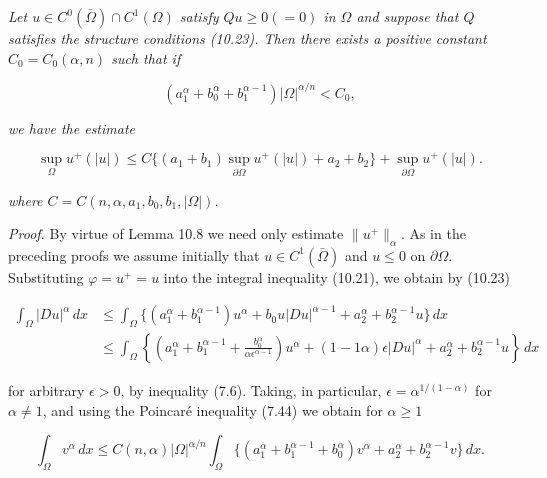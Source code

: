 \begin{theorem}\label{gilbarg-trudinger.thm.10.10.small-data-divergence-form-bound}
\textit{Let $u \in C^0(\bar{\Omega}) \cap C^1(\Omega)$ satisfy $Qu \geq 0 (=0)$ in $\Omega$ and suppose
that $Q$ satisfies the structure conditions (10.23). Then there exists a positive constant
$C_0 = C_0(\alpha,n)$ such that if}

\begin{equation}
(a_1^{\alpha} + b_0^{\alpha} + b_1^{\alpha-1})|\Omega|^{\alpha/n} < C_0,
\tag{10.28}
\end{equation}

\textit{we have the estimate}

\begin{equation}
\sup_{\Omega} u^+(|u|) \leq C\{(a_1+b_1)\sup_{\partial\Omega} u^+(|u|) + a_2 + b_2\} + \sup_{\partial\Omega} u^+(|u|).
\tag{10.29}
\end{equation}

\textit{where $C = C(n,\alpha,a_1,b_0,b_1,|\Omega|)$.}
\end{theorem}

\medskip

\noindent\textit{Proof.} By virtue of Lemma 10.8 we need only estimate $\|u^+\|_{\alpha}$. As in the preceding
proofs we assume initially that $u \in C^1(\bar{\Omega})$ and $u \leq 0$ on $\partial\Omega$. Substituting $\varphi = u^+ = u$
into the integral inequality (10.21), we obtain by (10.23)

\begin{align*}
\int_{\Omega} |Du|^{\alpha}\,dx
&\leq \int_{\Omega} \{(a_1^{\alpha} + b_1^{\alpha-1})u^{\alpha} + b_0 u|Du|^{\alpha-1} + a_2^{\alpha} + b_2^{\alpha-1}u\}\,dx \\
&\leq \int_{\Omega} \left\{\left(a_1^{\alpha} + b_1^{\alpha-1} + \frac{b_0^{\alpha}}{\alpha \epsilon^{\alpha-1}}\right)u^{\alpha} + (1-1\alpha)\epsilon|Du|^{\alpha} + a_2^{\alpha} + b_2^{\alpha-1}u\right\}\,dx
\end{align*}

for arbitrary $\epsilon>0$, by inequality (7.6). Taking, in particular, $\epsilon=\alpha^{1/(1-\alpha)}$ for $\alpha\neq 1$,
and using the Poincar\'e inequality (7.44) we obtain for $\alpha\geq 1$

\[
\int_{\Omega} v^{\alpha}\,dx \leq C(n,\alpha)|\Omega|^{\alpha/n}\int_{\Omega}\{(a_1^{\alpha} + b_1^{\alpha-1} + b_0^{\alpha})v^{\alpha} + a_2^{\alpha} + b_2^{\alpha-1}v\}\,dx.
\]

